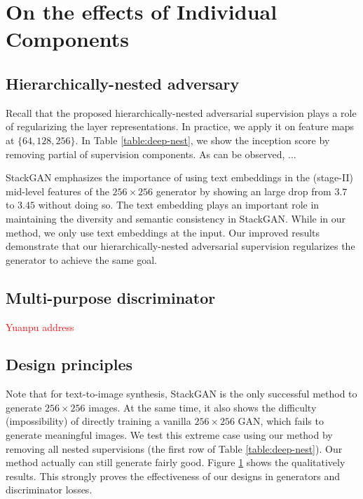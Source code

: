 \documentclass[10pt,twocolumn,letterpaper]{article}
\begin{document}
\section{On the effects of Individual Components}
\subsection{Hierarchically-nested adversary}
Recall that the proposed hierarchically-nested adversarial supervision plays a role of regularizing the layer representations. In practice, we apply it on feature maps at $\{64, 128, 256\}$. In Table \ref{table:deep-nest}, we show the inception score by removing partial of supervision components. As can be observed, ...

StackGAN emphasizes the importance of using text embeddings in the (stage-II) mid-level features of the $256{\times}256$ generator by showing an large drop from $3.7$ to $3.45$ without doing so. The text embedding plays an important role in maintaining the diversity and semantic consistency in StackGAN. While in our method, we only use text embeddings at the input. Our improved results demonstrate that our hierarchically-nested adversarial supervision regularizes the generator to achieve the same goal. 


\subsection{Multi-purpose discriminator}
\textcolor{red}{Yuanpu address}

\begin{figure}[t]
	\centering
	\caption{} \label{fig:vallina-res}
\end{figure}


\subsection{Design principles}
Note that for text-to-image synthesis, StackGAN is the only successful method to generate $256{\times}256$ images.
At the same time, it also shows the difficulty (impossibility) of directly training a vanilla $256{\times}256$ GAN, which fails to generate meaningful images. 
We test this extreme case using our method by removing all nested supervisions (the first row of Table \ref{table:deep-nest}). 
Our method actually can still generate fairly good. Figure \ref{fig:vallina-res} shows the qualitatively results. This strongly proves the effectiveness of our designs in generators and discriminator losses.
\end{document}
